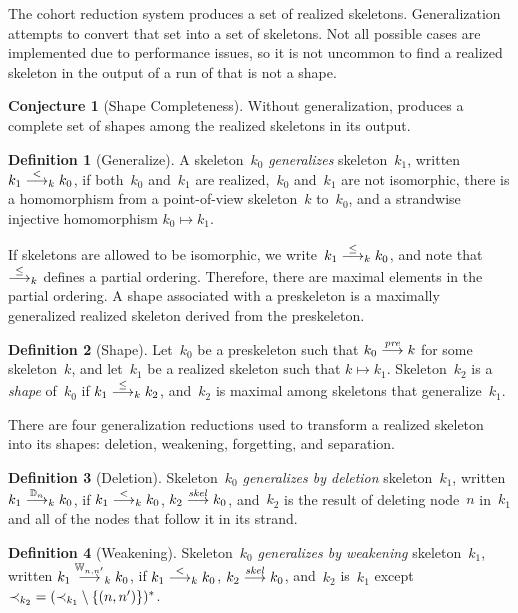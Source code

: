 \documentclass[12pt]{report}
\theoremstyle{definition}
\newtheorem{defn}{Definition}[chapter]
\newtheorem{conj}[thm]{Conjecture}
\begin{document}
The cohort reduction system produces a set of realized skeletons.
Generalization attempts to convert that set into a set of skeletons.
Not all possible cases are implemented due to performance issues, so
it is not uncommon to find a realized skeleton in the output of a run
of {\cpsa} that is not a shape.

\begin{conj}[Shape Completeness]
Without generalization, {\cpsa} produces a complete set of shapes
among the realized skeletons in its output.
\end{conj}

\begin{defn}[Generalize]
A skeleton~$k_0$ \emph{generalizes}
skeleton~$k_1$, written $k_1\stackrel{<}{\longrightarrow}_k k_0$, if
both~$k_0$ and~$k_1$ are realized,~$k_0$ and~$k_1$ are not isomorphic,
there is a homomorphism from a point-of-view skeleton~$k$ to~$k_0$, and
a strandwise injective homomorphism $k_0\mapsto k_1$.
\end{defn}

If skeletons are allowed to be isomorphic, we
write~$k_1\stackrel{\leq}{\longrightarrow}_k k_0$, and note that $\stackrel{\leq}{\longrightarrow}_k$
defines a partial ordering.  Therefore, there are maximal elements in
the partial ordering.  A shape associated with a preskeleton
is a maximally generalized realized skeleton derived from the
preskeleton.

\begin{defn}[Shape]
Let~$k_0$ be a preskeleton such that $k_0\stackrel{\operatorname{\mathit{pre}}}{\longrightarrow}k$ for
some skeleton~$k$, and let~$k_1$ be a realized skeleton such that
$k\mapsto k_1$.  Skeleton~$k_2$ is a \emph{shape}
of~$k_0$ if $k_1\stackrel{\leq}{\longrightarrow}_k k_2$, and~$k_2$ is maximal among
skeletons that generalize~$k_1$.
\end{defn}

There are four generalization reductions used to transform a realized
skeleton into its shapes: deletion, weakening, forgetting, and
separation.

\begin{defn}[Deletion]
Skeleton~$k_0$ \emph{generalizes by deletion}
skeleton~$k_1$, written $k_1\stackrel{\mathbb D_n}{\longrightarrow}_k k_0$, if
$k_1\stackrel{<}{\longrightarrow}_k k_0$, $k_2\stackrel{\operatorname{\mathit{skel}}}{\longrightarrow}k_0$, and~$k_2$ is
the result of deleting node~$n$ in~$k_1$ and all of the nodes that
follow it in its strand.
\end{defn}

\begin{defn}[Weakening]
Skeleton~$k_0$ \emph{generalizes by weakening}
skeleton~$k_1$, written $k_1\stackrel{\mathbb W_{n,n'}}{\longrightarrow}_k k_0$, if
$k_1\stackrel{<}{\longrightarrow}_k k_0$, $k_2\stackrel{\operatorname{\mathit{skel}}}{\longrightarrow}k_0$, and~$k_2$
is~$k_1$ except $\mathbin{\prec_{k_2}}=(\mathbin{\prec_{k_1}}\setminus\{(n,n')\})^\ast$.
\end{defn}
\end{document}
